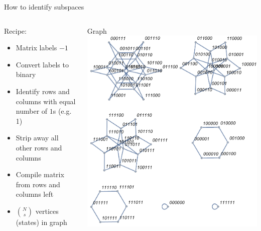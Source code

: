 \documentclass{beamer}
\begin{document}
\begin{frame}{How to identify subspaces}
	\begin{columns}[T]
		\begin{column}{0.5\textwidth}
			\centering
   			Recipe:
   			\begin{itemize}
   				\item Matrix labels $-1$
   				\item Convert labels to binary
   				\item Identify rows and columns with equal number of $1$s (e.g. 1)
   				\item Strip away all other rows and columns
   				\item Compile matrix from rows and columns left
   				\item ${N \choose s}$ vertices (states) in graph
   			\end{itemize}
   		\end{column}
		\begin{column}{0.5\textwidth}
			\centering
    		Graph
    		\includegraphics[trim=0 0 0 0mm, width=\textwidth]{Images/ring6_hamilton_graph3d_alt}
		\end{column}
	\end{columns}
\end{frame}
\end{document}
